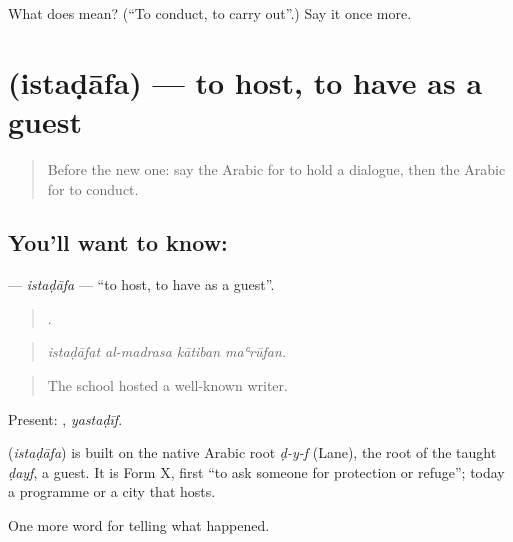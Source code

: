 \begin{tcolorbox}[breakable,colback=teal!4,colframe=teal!35!black,title={Before you move on}]
What does  mean? (\textquotedblleft{}To conduct, to carry out\textquotedblright{}.) Say it once more.
\end{tcolorbox}
\section[\texorpdfstring{\ar{استضاف} (istaḍāfa)}{استضاف (istaḍāfa)}]{ (istaḍāfa) — to host, to have as a guest}

\label{lesson:AR-C302-istadafa}



\begin{quote}
Before the new one: say the Arabic for to hold a dialogue, then the Arabic for to conduct.
\end{quote}

\subsection*{You'll want to know: }
\textbf{} — \emph{istaḍāfa} — \textquotedblleft{}to host, to have as a guest\textquotedblright{}.

\begin{quote}
   .
\end{quote}

\begin{quote}
\emph{istaḍāfat al-madrasa kātiban maʿrūfan.}
\end{quote}

\begin{quote}
The school hosted a well-known writer.
\end{quote}

Present: , \emph{yastaḍīf}.

\begin{cousinweb}
\textbf{} (\emph{istaḍāfa}) is built on the native Arabic root \emph{ḍ-y-f} (Lane), the root of the taught \emph{ḍayf}, a guest. It is Form X, first \textquotedblleft{}to ask someone for protection or refuge\textquotedblright{}; today a programme or a city that hosts.
\end{cousinweb}

\begin{grammarlens}[title={What you've built}]
One more word for telling what happened.
\end{grammarlens}

